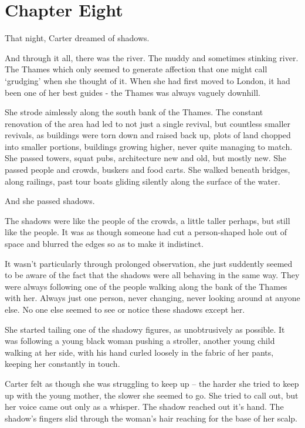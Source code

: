 \chapter*{Chapter Eight}

That night, Carter dreamed of shadows.

And through it all, there was the river.  The muddy and sometimes stinking river.  The Thames which only seemed to generate affection that one might call `grudging' when she thought of it.  When she had first moved to London, it had been one of her best guides - the Thames was always vaguely downhill.

She strode aimlessly along the south bank of the Thames.  The constant renovation of the area had led to not just a single revival, but countless smaller revivals, as buildings were torn down and raised back up, plots of land chopped into smaller portions, buildings growing higher, never quite managing to match.  She passed towers, squat pubs, architecture new and old, but mostly new.  She passed people and crowds, buskers and food carts.  She walked beneath bridges, along railings, past tour boats gliding silently along the surface of the water.

And she passed shadows.

The shadows were like the people of the crowds, a little taller perhaps, but still like the people.  It was as though someone had cut a person-shaped hole out of space and blurred the edges so as to make it indistinct.

It wasn't particularly through prolonged observation, she just suddently seemed to be aware of the fact that the shadows were all behaving in the same way.  They were always following one of the people walking along the bank of the Thames with her.  Always just one person, never changing, never looking around at anyone else.  No one else seemed to see or notice these shadows except her.

She started tailing one of the shadowy figures, as unobtrusively as possible.  It was following a young black woman pushing a stroller, another young child walking at her side, with his hand curled loosely in the fabric of her pants, keeping her constantly in touch.

Carter felt as though she was struggling to keep up -- the harder she tried to keep up with the young mother, the slower she seemed to go.  She tried to call out, but her voice came out only as a whisper.  The shadow reached out it's hand.  The shadow's fingers slid through the woman's hair reaching for the base of her scalp.

